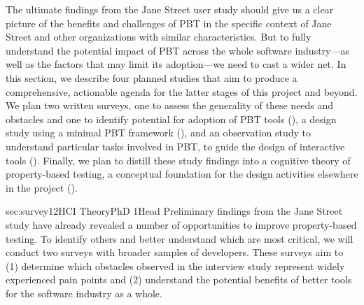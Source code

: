 \iflater{}\fi


\iflater{}\fi

The ultimate findings from the Jane Street user study\iflater{}\fi{} should
give us a clear
picture of the benefits and challenges of PBT in the specific context
of Jane Street and other organizations with similar characteristics.  But to
fully understand the potential impact of PBT across the whole software
industry---as well as the factors that may limit its adoption---we need to
cast a wider net.
%
In this section, we describe four planned studies that aim
to produce a comprehensive, actionable
agenda for the latter stages of this project and beyond.  We plan two
written surveys, one to assess the generality of these needs and obstacles
and one to identify potential for adoption of PBT tools
(), a design study using a minimal PBT
framework (), and an observation study to understand
particular tasks involved in PBT, to guide the design of
interactive tools
(). Finally, we plan to distill these
study findings into a cognitive
theory of property-based testing, a conceptual foundation for the
design activities elsewhere in the project ().


%
   {sec:survey}{1}{2}{HCI Theory}{PhD 1}{}{Head}
%
Preliminary findings from the Jane Street study have already revealed
a number of
opportunities to improve property-based testing. To identify
others and better understand which are most
critical, we will conduct two
surveys with broader samples of developers. These surveys aim to
(1) determine which obstacles observed in the interview
study\iflater{}\fi{}
represent widely experienced pain points and
(2) understand the potential benefits of better tools for the
software industry as a whole.

